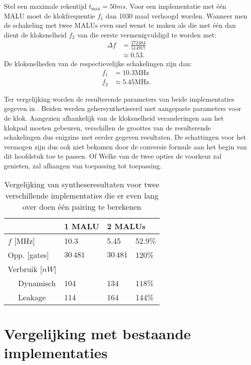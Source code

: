 Stel een maximale rekentijd $t_{\text{max}} = 50ms$. Voor een implementatie met \'e\'en MALU moet de klokfrequentie $f_1$ dan 1030 maal verhoogd worden. Wanneer men de schakeling met twee MALUs even snel wenst te maken als die met \'e\'en dan dient de kloksnelheid $f_2$ van die eerste vermenigvuldigd te worden met:
\[\begin{aligned}
\Delta f &= \frac{272484}{514917}\\
	&\approx 0.53.
\end{aligned}\]
De kloksnelheden van de respectievelijke schakelingen zijn dan:
\[\begin{aligned}
f_1	&= 10.3\text{MHz}\\
f_2	&\approx 5.45\text{MHz}.
\end{aligned}\]

Ter vergelijking worden de resulterende parameters van beide implementaties gegeven in . Beiden werden gehersynthetiseerd met aangepaste parameters voor de klok. Aangezien afhankelijk van de kloksnelheid veranderingen aan het klokpad moeten gebeuren, verschillen de groottes van de resulterende schakelingen dus enigzins met eerder gegeven resultaten. De schattingen voor het vermogen zijn dus ook niet bekomen door de conversie formule aan het begin van dit hoofdstuk toe te passen. Of Welke van de twee opties de voorkeur zal genieten, zal afhangen van toepassing tot toepassing.

\begin{table}[h]
	\caption{Vergelijking van syntheseresultaten voor twee verschillende implementaties die er even lang over doen \'e\'en pairing te berekenen}
	\label{tabel-resultaten-m1-vs-m2}

	\centering
	\begin{tabular}{lll@{$\;\;$}l}
		\toprule
		& 1 MALU	& \multicolumn{2}{l}{2 MALUs}\\
		\midrule
		$f$ [MHz]					& 10.3		& 5.45		& 52.9\% \\ 
		Opp. [gates]				& $30\,481$	& $30\,481$	& 120\% \\
		Verbruik [$nW$]			& 				& 				& \\
		$\quad$ Dynamisch			& 104			& 134			& 118\% \\
		$\quad$ Leakage			& 114			& 164			& 144\% \\
		\bottomrule	
	\end{tabular}
\end{table}

\section{Vergelijking met bestaande implementaties}

